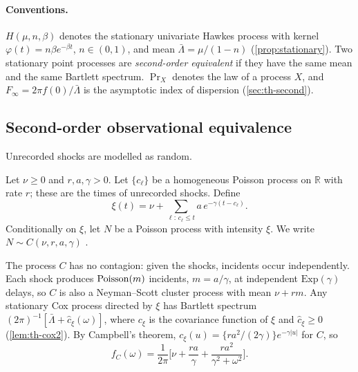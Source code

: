 \paragraph{Conventions.} $H(\mu,n,\beta)$ denotes the stationary univariate Hawkes
process with kernel $\varphi(t)=n\beta e^{-\beta t}$, $n\in(0,1)$, and mean
$\bar\Lambda=\mu/(1-n)$ (\cref{prop:stationary}). Two stationary point processes are
\emph{second-order equivalent} if they have the same mean and the same Bartlett
spectrum. $\Pr_X$ denotes the law of a process $X$, and $F_\infty=2\pi f(0)/\bar\Lambda$
is the asymptotic index of dispersion (\cref{sec:th-second}).

\subsection{Second-order observational equivalence}\label{sec:th-equiv}

Unrecorded shocks are modelled as random.

\begin{definition}\label{def:th-sncox}
Let $\nu\ge0$ and $r,a,\gamma>0$. Let $\{c_\ell\}$ be a homogeneous Poisson process
on $\mathbb R$ with rate $r$; these are the times of unrecorded shocks. Define
\[
\xi(t)=\nu+\sum_{\ell:\,c_\ell\le t}a\,e^{-\gamma(t-c_\ell)} .
\]
Conditionally on $\xi$, let $N$ be a Poisson process with intensity $\xi$. We write
$N\sim C(\nu,r,a,\gamma)$ \citep{cox1955,moller2003}.
\end{definition}

The process $C$ has no contagion: given the shocks, incidents occur independently.
Each shock produces $\operatorname{Poisson}(m)$ incidents, $m=a/\gamma$, at independent
$\mathrm{Exp}(\gamma)$ delays, so $C$ is also a Neyman--Scott cluster process with mean
$\nu+r m$. Any stationary Cox process directed by $\xi$ has Bartlett spectrum
$(2\pi)^{-1}[\bar\Lambda+\hat c_\xi(\omega)]$, where $c_\xi$ is the covariance function
of $\xi$ and $\hat c_\xi\ge0$ (\cref{lem:th-cox2}). By Campbell's theorem,
$c_\xi(u)=\{r a^2/(2\gamma)\}e^{-\gamma|u|}$ for $C$, so
\begin{equation}\label{eq:th-fC}
  f_C(\omega)=\frac1{2\pi}\Big[\nu+\frac{r a}{\gamma}+\frac{r a^2}{\gamma^2+\omega^2}\Big].
\end{equation}

